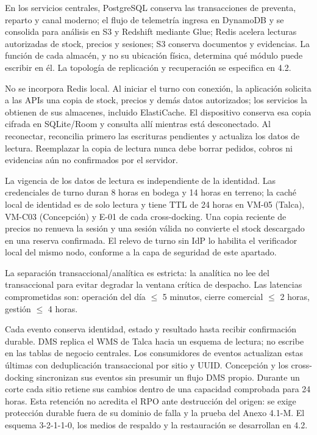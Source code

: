 En los servicios centrales, PostgreSQL conserva las transacciones de preventa, reparto y canal moderno; el flujo de telemetría ingresa en DynamoDB y se consolida para análisis en S3 y Redshift mediante Glue; Redis acelera lecturas autorizadas de stock, precios y sesiones; S3 conserva documentos y evidencias. La función de cada almacén, y no su ubicación física, determina qué módulo puede escribir en él. La topología de replicación y recuperación se especifica en 4.2.

No se incorpora Redis local. Al iniciar el turno con conexión, la aplicación solicita a las APIs una copia de stock, precios y demás datos autorizados; los servicios la obtienen de sus almacenes, incluido ElastiCache. El dispositivo conserva esa copia cifrada en SQLite/Room y consulta allí mientras está desconectado. Al reconectar, reconcilia primero las escrituras pendientes y actualiza los datos de lectura. Reemplazar la copia de lectura nunca debe borrar pedidos, cobros ni evidencias aún no confirmados por el servidor.

La vigencia de los datos de lectura es independiente de la identidad. Las credenciales de turno duran 8 horas en bodega y 14 horas en terreno; la caché local de identidad es de solo lectura y tiene TTL de 24 horas en VM-05 (Talca), VM-C03 (Concepción) y E-01 de cada cross-docking. Una copia reciente de precios no renueva la sesión y una sesión válida no convierte el stock descargado en una reserva confirmada. El relevo de turno sin IdP lo habilita el verificador local del mismo nodo, conforme a la capa de seguridad de este apartado.

La separación transaccional/analítica es estricta: la analítica no lee del transaccional para evitar degradar la ventana crítica de despacho. Las latencias comprometidas son: operación del día $\leq$ 5 minutos, cierre comercial $\leq$ 2 horas, gestión $\leq$ 4 horas.

Cada evento conserva identidad, estado y resultado hasta recibir confirmación durable. DMS replica el WMS de Talca hacia un esquema de lectura; no escribe en las tablas de negocio centrales. Los consumidores de eventos actualizan estas últimas con deduplicación transaccional por sitio y UUID. Concepción y los cross-docking sincronizan sus eventos sin presumir un flujo DMS propio. Durante un corte cada sitio retiene sus cambios dentro de una capacidad comprobada para 24 horas. Esta retención no acredita el RPO ante destrucción del origen: se exige protección durable fuera de su dominio de falla y la prueba del Anexo 4.1-M. El esquema 3-2-1-1-0, los medios de respaldo y la restauración se desarrollan en 4.2.

